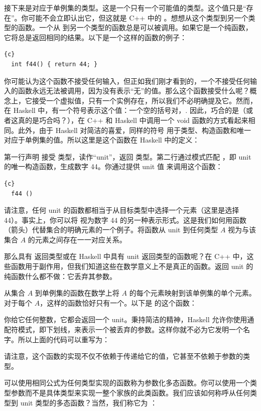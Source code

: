 接下来是对应于单例集的类型。这是一个只有一个可能值的类型。这个值只是“存在”。你可能不会立即认出它，但这就是 C++ 中的 。想想从这个类型到另一个类型的函数。一个从  到另一个类型的函数总是可以被调用。如果它是一个纯函数，它将总是返回相同的结果。以下是一个这样的函数的例子：

\begin{lstlisting}{c}
  int f44() { return 44; }
\end{lstlisting}
你可能认为这个函数不接受任何输入，但正如我们刚才看到的，一个不接受任何输入的函数永远无法被调用，因为没有表示“无”的值。那么这个函数接受什么呢？概念上，它接受一个虚拟值，只有一个实例存在，所以我们不必明确提及它。然而，在 Haskell 中，有一个符号表示这个值：一个空的括号对，\code{()}. 因此，巧合的是（或者这真的是巧合吗？），在 C++ 和 Haskell 中调用一个 void 函数的方式看起来相同。此外，由于 Haskell 对简洁的喜爱，同样的符号 \code{()} 用于类型、构造函数和唯一对应于单例集的值。所以这里是这个函数在 Haskell 中的定义：

第一行声明  接受 \code{()} 类型，读作“unit”，返回  类型。第二行通过模式匹配 \code{()}，即 unit 的唯一构造函数，生成数字 44。你通过提供 unit 值 \code{()} 来调用这个函数：

\begin{lstlisting}{c}
  f44 ()
\end{lstlisting}
请注意，任何 unit 的函数都相当于从目标类型中选择一个元素（这里是选择  44）。事实上，你可以将  视为数字 44 的另一种表示形式。这是我们如何用函数（箭头）代替集合的明确元素的一个例子。将函数从 unit 到任何类型 $A$ 视为与该集合 $A$ 的元素之间存在一一对应关系。

那么具有  返回类型或在 Haskell 中具有 unit 返回类型的函数呢？在 C++ 中，这些函数用于副作用，但我们知道这些在数学意义上不是真正的函数。返回 unit 的纯函数什么都不做：它丢弃其参数。

从集合 $A$ 到单例集的函数在数学上将 $A$ 的每个元素映射到该单例集的单个元素。对于每个 $A$，这样的函数恰好只有一个。以下是  的这个函数：

你给它任何整数，它都会返回一个 unit。秉持简洁的精神，Haskell 允许你使用通配符模式，即下划线，来表示一个被丢弃的参数。这样你就不必为它发明一个名字。所以上面的代码可以重写为：

请注意，这个函数的实现不仅不依赖于传递给它的值，它甚至不依赖于参数的类型。

可以使用相同公式为任何类型实现的函数称为参数化多态函数。你可以使用一个类型参数而不是具体类型来实现一整个家族的此类函数。我们应该如何称呼从任何类型到 unit 类型的多态函数？当然，我们称它为 ：

